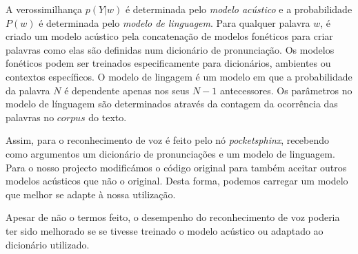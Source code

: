 \documentclass[journal]{IEEEtran}
\begin{document}
A verossimilhança $p(Y|w)$ é determinada pelo \emph{modelo acústico} e a probabilidade $P(w)$ é determinada pelo \emph{modelo de linguagem}. Para qualquer palavra $w$, é criado um modelo acústico pela concatenação de modelos fonéticos para criar palavras como elas são definidas num dicionário de pronunciação. Os modelos fonéticos podem ser treinados especificamente para dicionários, ambientes ou contextos específicos. O modelo de lingagem é um modelo em que a probabilidade da palavra $N$ é dependente apenas nos seus $N-1$ antecessores. Os parâmetros no modelo de línguagem são determinados através da contagem da ocorrência das palavras no $corpus$ do texto.


Assim, para o reconhecimento de voz é feito pelo nó \textit{pocketsphinx}, recebendo como argumentos um dicionário de pronunciações e um modelo de linguagem. Para o nosso projecto modificámos o código original para também aceitar outros modelos acústicos que não o original. Desta forma, podemos carregar um modelo que melhor se adapte à nossa utilização.

Apesar de não o termos feito, o desempenho do reconhecimento de voz poderia ter sido melhorado se se tivesse treinado o modelo acústico ou adaptado ao dicionário utilizado.

\end{document}
